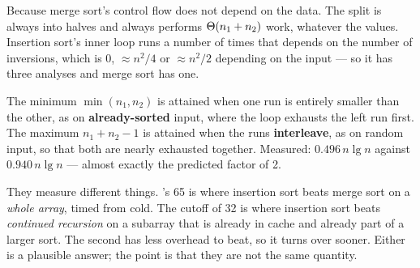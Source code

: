 \begin{ans}
  \item Because merge sort's control flow does not depend on the data. The
        split is always into halves and  always performs
        $\Theta(n_{1}+n_{2})$ work, whatever the values. Insertion sort's inner
        loop runs a number of times that depends on the number of inversions,
        which is 0, $\approx n^{2}/4$ or $\approx n^{2}/2$ depending on the
        input --- so it has three analyses and merge sort has one.
  \item The minimum $\min(n_{1},n_{2})$ is attained when one run is entirely
        smaller than the other, as on \textbf{already-sorted} input, where the
        loop exhausts the left run first. The maximum $n_{1}+n_{2}-1$ is
        attained when the runs \textbf{interleave}, as on random input, so that
        both are nearly exhausted together. Measured: $0.496\,n\lg n$ against
        $0.940\,n\lg n$ --- almost exactly the predicted factor of 2.
  \item They measure different things. 's 65 is where insertion
        sort beats merge sort on a \emph{whole array}, timed from cold. The
        cutoff of 32 is where insertion sort beats \emph{continued recursion}
        on a subarray that is already in cache and already part of a larger
        sort. The second has less overhead to beat, so it turns over sooner.
        Either is a plausible answer; the point is that they are not the same
        quantity.
\end{ans}


